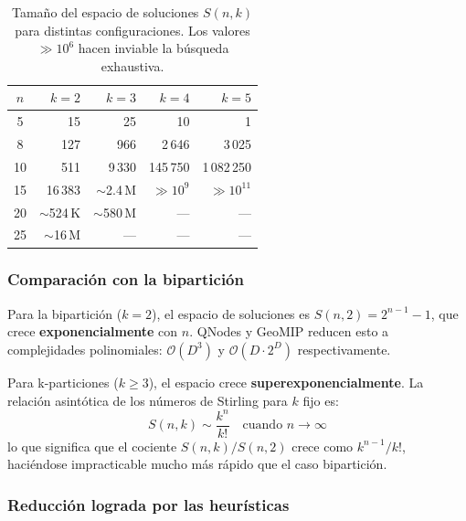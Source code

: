\begin{table}[H]
  \centering
  \caption{Tamaño del espacio de soluciones $S(n,k)$ para distintas configuraciones.
           Los valores $\gg 10^6$ hacen inviable la búsqueda exhaustiva.}
  \label{tab:espacios}
  \begin{tabular}{crrrr}
    \toprule
    $n$ & $k=2$ & $k=3$ & $k=4$ & $k=5$ \\
    \midrule
    5  & 15           & 25              & 10                & 1               \\
    8  & 127          & 966             & 2\,646            & 3\,025          \\
    10 & 511          & 9\,330          & 145\,750          & 1\,082\,250     \\
    15 & 16\,383      & $\sim$2.4\,M    & \cellcolor{gray!20}$\gg 10^9$  & \cellcolor{gray!20}$\gg 10^{11}$ \\
    20 & $\sim$524\,K & \cellcolor{gray!20}$\sim$580\,M & \cellcolor{gray!20}---          & \cellcolor{gray!20}---          \\
    25 & $\sim$16\,M  & \cellcolor{gray!20}---          & \cellcolor{gray!20}---          & \cellcolor{gray!20}---          \\
    \bottomrule
  \end{tabular}
\end{table}

\subsubsection*{Comparación con la bipartición}

Para la bipartición ($k=2$), el espacio de soluciones es $S(n,2) = 2^{n-1} - 1$, que crece
\textbf{exponencialmente} con $n$. QNodes y GeoMIP reducen esto a complejidades polinomiales:
$\mathcal{O}(D^3)$ y $\mathcal{O}(D \cdot 2^D)$ respectivamente.

Para k-particiones ($k \geq 3$), el espacio crece \textbf{superexponencialmente}. La relación
asintótica de los números de Stirling para $k$ fijo es:
\begin{equation}
  S(n, k) \sim \frac{k^n}{k!} \quad \text{cuando } n \to \infty
  \label{eq:stirling_asintotico}
\end{equation}
lo que significa que el cociente $S(n,k) / S(n,2)$ crece como $k^{n-1}/k!$, haciéndose
impracticable mucho más rápido que el caso bipartición.

\subsubsection*{Reducción lograda por las heurísticas}

